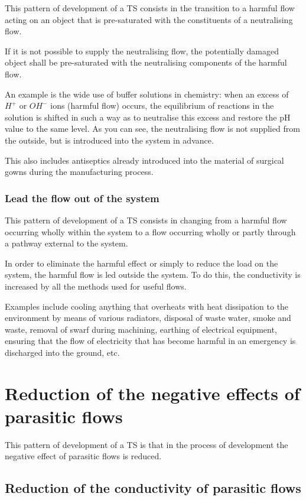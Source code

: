 \documentclass[a4paper,11pt]{article}
\begin{document}
This pattern of development of a TS consists in the transition to a harmful
flow acting on an object that is pre-saturated with the constituents of a
neutralising flow.

If it is not possible to supply the neutralising flow, the potentially damaged
object shall be pre-saturated with the neutralising components of the harmful
flow.

An example is the wide use of buffer solutions in chemistry: when an excess of
$H^+$ or $OH^-$ ions (harmful flow) occurs, the equilibrium of reactions in
the solution is shifted in such a way as to neutralise this excess and restore
the pH value to the same level. As you can see, the neutralising flow is not
supplied from the outside, but is introduced into the system in advance.

This also includes antiseptics already introduced into the material of
surgical gowns during the manufacturing process.

\subsubsection{Lead the flow out of the system}

This pattern of development of a TS consists in changing from a harmful
flow occurring wholly within the system to a flow occurring wholly or partly
through a pathway external to the system.

In order to eliminate the harmful effect or simply to reduce the load on the
system, the harmful flow is led outside the system. To do this, the
conductivity is increased by all the methods used for useful flows.

Examples include cooling anything that overheats with heat dissipation to the
environment by means of various radiators, disposal of waste water, smoke and
waste, removal of swarf during machining, earthing of electrical equipment,
ensuring that the flow of electricity that has become harmful in an emergency
is discharged into the ground, etc.

\section{Reduction of the negative effects of parasitic flows}

This pattern of development of a TS is that in the process of development the
negative effect of parasitic flows is reduced.

\subsection{Reduction of the conductivity of parasitic flows}
\end{document}
